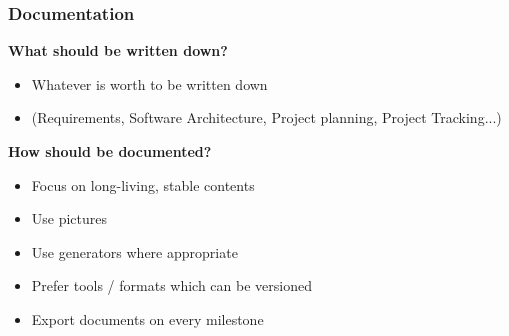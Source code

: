 \subsubsection{Documentation}
\textbf{What should be written down?}
\begin{itemize}
    \item Whatever is worth to be written down
    \item (Requirements, Software Architecture, Project planning, Project Tracking...)
\end{itemize}
\textbf{How should be documented?}
\begin{itemize}
    \item Focus on long-living, stable contents
    \item Use pictures
    \item Use generators where appropriate
    \item Prefer tools / formats which can be versioned
    \item Export documents on every milestone
\end{itemize}